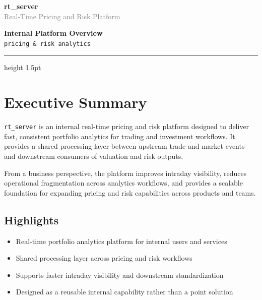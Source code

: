 \documentclass[10pt]{article}
\begin{document}
\begin{minipage}[t]{0.62\textwidth}
	{\Huge \textbf{\textcolor{brandblue}{rt\_server}}} \\[0.5em]
	{\large \textcolor{gray}{Real-Time Pricing and Risk Platform}}
\end{minipage}
\begin{minipage}[t]{0.38\textwidth}
	\raggedleft
	\textbf{Internal Platform Overview}\\
	\texttt{pricing \& risk analytics}
\end{minipage}

\vspace{1.5em}
\hrule height 1.5pt \relax
\vspace{1.5em}

\begin{minipage}[t]{0.58\textwidth}
	\section*{\textcolor{brandblue}{Executive Summary}}
	\texttt{rt\_server} is an internal real-time pricing and risk platform designed to deliver fast, consistent portfolio analytics for trading and investment workflows. It provides a shared processing layer between upstream trade and market events and downstream consumers of valuation and risk outputs.

	\vspace{0.8em}

	From a business perspective, the platform improves intraday visibility, reduces operational fragmentation across analytics workflows, and provides a scalable foundation for expanding pricing and risk capabilities across products and teams.

	\subsection*{Highlights}
	\begin{itemize}
		\item Real-time portfolio analytics platform for internal users and services
		\item Shared processing layer across pricing and risk workflows
		\item Supports faster intraday visibility and downstream standardization
		\item Designed as a reusable internal capability rather than a point solution
	\end{itemize}
\end{minipage}
\end{document}
